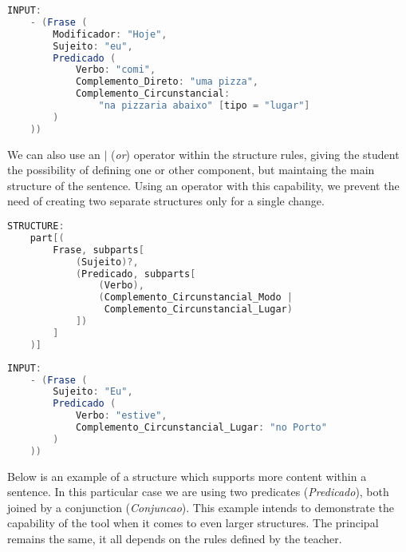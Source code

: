 \begin{center}
\begin{minipage}{15cm}
\begin{lstlisting}[language=java, basicstyle=\small, label={lst:example_input3}, caption=Example of a sentence input]
INPUT:
    - (Frase (
        Modificador: "Hoje",
        Sujeito: "eu",
        Predicado (
            Verbo: "comi",
            Complemento_Direto: "uma pizza",
            Complemento_Circunstancial: 
                "na pizzaria abaixo" [tipo = "lugar"]
        )
    ))
\end{lstlisting}
\end{minipage}
\end{center}


We can also use an \textbf{\(|\)} (\textit{or}) operator within the structure rules, giving the student the possibility of defining one or other component,
but maintaing the main structure of the sentence. 
Using an operator with this capability, we prevent the need of creating two separate structures only for a single change. 

\begin{center}
\begin{minipage}{14cm}
\begin{lstlisting}[language=java, basicstyle=\small, label={lst:example_structure4}, caption=Example of a sentence structure]
STRUCTURE:
    part[(
        Frase, subparts[
            (Sujeito)?,
            (Predicado, subparts[
                (Verbo),
                (Complemento_Circunstancial_Modo | 
                 Complemento_Circunstancial_Lugar)
            ])
        ]
    )]
\end{lstlisting}
\end{minipage}
\end{center}

\begin{center}
\begin{minipage}{14cm}
\begin{lstlisting}[language=java, basicstyle=\small, label={lst:example_input4}, caption=Example of a sentence input]
INPUT:
    - (Frase (
        Sujeito: "Eu",
        Predicado (
            Verbo: "estive",
            Complemento_Circunstancial_Lugar: "no Porto"
        )
    ))
\end{lstlisting}
\end{minipage}
\end{center}


Below is an example of a structure which supports more content within a sentence.
In this particular case we are using two predicates (\textit{Predicado}), both joined by a conjunction (\textit{Conjuncao}).
This example intends to demonstrate the capability of the tool when it comes to even larger structures.
The principal remains the same, it all depends on the rules defined by the teacher.

